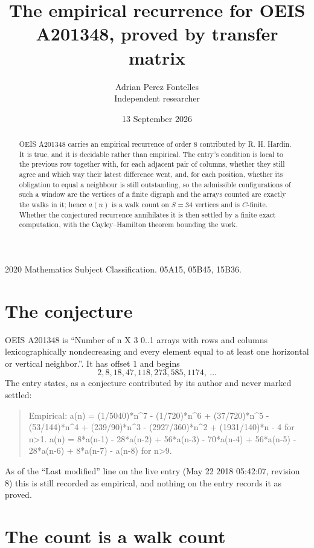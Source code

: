 \documentclass[11pt,a4paper]{article}
\title{The empirical recurrence for OEIS A201348, proved by transfer matrix}
\author{Adrian Perez Fontelles\\ \small Independent researcher}
\date{13 September 2026}
\theoremstyle{plain}
\theoremstyle{definition}
\begin{document}
\maketitle

\begin{abstract}
OEIS A201348 carries an empirical recurrence of order $8$ contributed by R. H. Hardin. It is
true, and it is decidable rather than empirical. The entry's condition is local to the previous row together with, for each adjacent pair of columns, whether they still agree and which way their latest difference went, and, for each position, whether its obligation to equal a neighbour is still outstanding, so
the admissible configurations of such a window are the vertices of a finite digraph and the
arrays counted are exactly the walks in it; hence $a(n)$ is a walk count on $S=34$ vertices
and is $C$-finite. Whether the conjectured recurrence annihilates it is then settled by a
finite exact computation, with the Cayley--Hamilton theorem bounding the work.
\end{abstract}

\noindent\small 2020 Mathematics Subject Classification. 05A15, 05B45, 15B36.\normalsize

\section{The conjecture}

OEIS A201348 is ``Number of n X 3 0..1 arrays with rows and columns lexicographically nondecreasing and every element equal to at least one horizontal or vertical neighbor.''. It has offset $1$ and begins
\[
2, 8, 18, 47, 118, 273, 585, 1174,\ \dots
\]
The entry states, as a conjecture contributed by its author and never marked settled:
\begin{quote}
Empirical: a(n) = (1/5040)*n\^{}7 - (1/720)*n\^{}6 + (37/720)*n\^{}5 - (53/144)*n\^{}4 + (239/90)*n\^{}3 - (2927/360)*n\^{}2 + (1931/140)*n - 4 for n>1. a(n) = 8*a(n-1) - 28*a(n-2) + 56*a(n-3) - 70*a(n-4) + 56*a(n-5) - 28*a(n-6) + 8*a(n-7) - a(n-8) for n>9.
\end{quote}
As of the ``Last modified'' line on the live entry (May 22 2018 05:42:07, revision 8) this is still
recorded as empirical, and nothing on the entry records it as proved.

\section{The count is a walk count}
\end{document}
